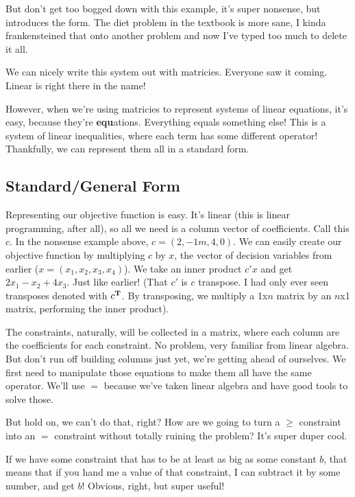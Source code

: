 \documentclass[12pt, letterpaper]{article}
\begin{document}
But don't get too bogged down with this example, it's super nonsense, but introduces the form.
The diet problem in the textbook is more sane, I kinda frankensteined that onto another
problem and now I've typed too much to delete it all.


We can nicely write this system out with matricies. Everyone saw it coming.
Linear is right there in the name!

However, when we're using matricies to represent systems of linear equations, it's easy, because they're \textbf{equ}ations.
Everything equals something else! This is a system of linear inequalities, where each term has some different operator! 
Thankfully, we can represent them all in a standard form.

\subsection{Standard/General Form}

Representing our objective function is easy. It's linear (this is linear programming, after all), so all we need is
a column vector of coefficients. Call this $c$. In the nonsense example above, $c = (2, -1m, 4, 0)$.
We can easily create our objective function by multiplying $c$ by $x$, the vector of decision variables from earlier ($x = (x_1, x_2, x_3, x_4)$).
We take an inner product $c'x$ and get $2x_1 - x_2 + 4x_3$. Just like earlier!
(That $c'$ is $c$ transpose. I had only ever seen transposes denoted with $c^\text{\textbf{T}}$. By transposing, we multiply a 1x$n$ matrix by an $n$x1 matrix, performing the inner product).

The constraints, naturally, will be collected in a matrix, where each column are the coefficients for each constraint. No problem,
very familiar from linear algebra. But don't run off building columns just yet, we're getting ahead of ourselves. We first need to
manipulate those equations to make them all have the same operator. We'll use $=$ because we've taken linear algebra and have good
tools to solve those.

But hold on, we can't do that, right? How are we going to turn a $\geq$ constraint into an $=$ constraint 
without totally ruining the problem? It's super duper cool.

If we have some constraint that has to be at least as big as some constant $b$, that means that if you hand me a value of that constraint,
I can subtract it by some number, and get $b$! Obvious, right, but super useful!
\end{document}
